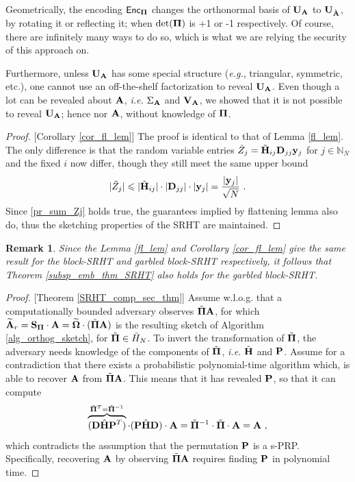 \documentclass[journal,letterpaper,onecolumn,twoside,nofonttune]{IEEEtran}
\newcommand{\Ub}{\bold{U}}
\newcommand{\Vb}{\bold{V}}
\newcommand{\yb}{\bold{y}}
\newcommand{\Pibold}{\bold{\Pi}}
\newcommand{\Pibt}{\tilde{\Pibold}}
\newcommand{\Omb}{\bold{\Omega}}
\newcommand{\Ombwt}{\widetilde{\Omb}}
\newcommand{\N}{\mathbb{N}}
\newcommand{\Pb}{\bold{P}}
\newcommand{\Sb}{\bold{S}}
\newcommand{\SbPi}{\Sb_{\Pibold}}
\newcommand{\Ab}{\bold{A}}
\newcommand{\Abg}{{\grave{\bold{A}}}}
\newcommand{\Db}{\bold{D}}
\newcommand{\Hbh}{\hat{\bold{H}}}
\newcommand{\Hbt}{\tilde{\bold{H}}}
\newcommand{\Ht}{\tilde{H}}
\newcommand{\sfsty}[1]{\ensuremath{\mathsf{#1}}}  %
\newcommand{\Enc}{\sfsty{Enc}}
\newtheorem{Rmk}{Remark}
\begin{document}
Geometrically, the encoding $\Enc_\Pibold$ changes the orthonormal basis of $\Ub_\Ab$ to $\Ub_\Abg$, by rotating it or reflecting it; when $\det(\Pibold)$ is +1 or -1 respectively. Of course, there are infinitely many ways to do so, which is what we are relying the security of this approach on.

Furthermore, unless $\Ub_\Ab$ has some special structure (\textit{e.g.}, triangular, symmetric, etc.), one cannot use an off-the-shelf factorization to reveal $\Ub_\Ab$. Even though a lot can be revealed about $\Ab$, \textit{i.e.} $\Sigma_\Ab$ and $\Vb_\Ab$, we showed that it is not possible to reveal $\Ub_\Ab$; hence nor $\Ab$, without knowledge of $\Pibold$.

\begin{proof}{[Corollary \ref{cor_fl_lem}]}
The proof is identical to that of Lemma \ref{fl_lem}. The only difference is that the random variable entries $\tilde{Z}_j=\Hbt_{ij}\Db_{jj}\yb_j$ for $j\in\N_N$ and the fixed $i$ now differ, though they still meet the same upper bound
$$|\tilde{Z}_j| \leqslant |\Hbt_{ij}|\cdot|\Db_{jj}|\cdot|\yb_j| = \frac{|\yb_j|}{\sqrt{N}}\ . $$
Since \eqref{pr_sum_Zj} holds true, the guarantees implied by flattening lemma also do, thus the sketching properties of the SRHT are maintained.
\end{proof}

\begin{Rmk}
Since the Lemma \ref{fl_lem} and Corollary \ref{cor_fl_lem} give the same result for the block-SRHT and garbled block-SRHT respectively, it follows that Theorem \ref{subsp_emb_thm_SRHT} also holds for the garbled block-SRHT.
\end{Rmk}

\begin{proof}{[Theorem \ref{SRHT_comp_sec_thm}]}
Assume w.l.o.g. that a computationally bounded adversary observes $\Pibt\Ab$, for which
$\widetilde{\Ab}_r=\SbPi\cdot\Ab=\Ombwt\cdot(\Pibt\Ab)$ is the resulting sketch of Algorithm \ref{alg_orthog_sketch}, for $\Pibt\in\Ht_N$. To invert the transformation of $\Pibt$, the adversary needs knowledge of the components of $\Pibt$, \textit{i.e.} $\Hbh$ and $\Pb$. Assume for a contradiction that there exists a probabilistic polynomial-time algorithm which, is able to recover $\Ab$ from $\Pibt\Ab$. This means that it has revealed $\Pb$, so that it can compute
$$ \overbrace{(\Db\Hbh\Pb^T)}^{\Pibt^T=\Pibt^{-1}}\cdot(\Pb\Hbh\Db)\cdot\Ab = \Pibt^{-1}\cdot\Pibt\cdot\Ab = \Ab\ , $$
which contradicts the assumption that the permutation $\Pb$ is a s-PRP. Specifically, recovering $\Ab$ by observing $\Pibt\Ab$ requires finding $\Pb$ in polynomial time.
\end{proof}
\end{document}

